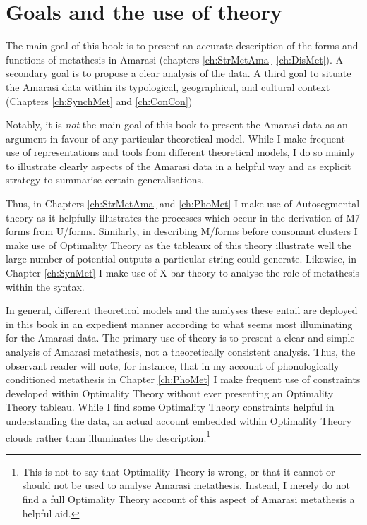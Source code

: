\section{Goals and the use of theory}\label{sec:GoaUseThe}
The main goal of this book is to present an accurate
description of the forms and functions of metathesis in Amarasi
(chapters \ref{ch:StrMetAma}--\ref{ch:DisMet}).
A secondary goal is to propose a clear analysis of the data.
A third goal to situate the Amarasi data within
its typological, geographical, and cultural context
(Chapters \ref{ch:SynchMet} and \ref{ch:ConCon})

Notably, it is \emph{not} the main goal of this book to
present the Amarasi data as an argument in
favour of any particular theoretical model.
While I make frequent use of representations and
tools from different theoretical models,
I do so mainly to illustrate clearly
aspects of the Amarasi data in a helpful way
and as explicit strategy to summarise certain generalisations.

Thus, in Chapters \ref{ch:StrMetAma} and \ref{ch:PhoMet}
I make use of Autosegmental theory as it helpfully
illustrates the processes which occur in the derivation of M\=/forms from U\=/forms.
Similarly, in describing M\=/forms before consonant clusters
 I make use of Optimality Theory
as the tableaux of this theory illustrate well the large
number of potential outputs a particular string could generate.
Likewise, in Chapter \ref{ch:SynMet} I make use of X-bar theory to analyse
the role of metathesis within the syntax.

In general, different theoretical models
and the analyses these entail are deployed in this book
in an expedient manner according to what seems most
illuminating for the Amarasi data.
The primary use of theory is to present a clear and simple
analysis of Amarasi metathesis,
not a theoretically consistent analysis.
Thus, the observant reader will note, for instance,
that in my account of phonologically conditioned metathesis
in Chapter \ref{ch:PhoMet} I make frequent use of
constraints developed within Optimality Theory
without ever presenting an Optimality Theory tableau.
While I find some Optimality Theory constraints helpful
in understanding the data, an actual account embedded within Optimality Theory
clouds rather than illuminates the description.\footnote{
		This is not to say that Optimality Theory is wrong,
		or that it cannot or should not be used to analyse Amarasi metathesis.
		Instead, I merely do not find a full Optimality Theory account
		of this aspect of Amarasi metathesis a helpful aid.}

